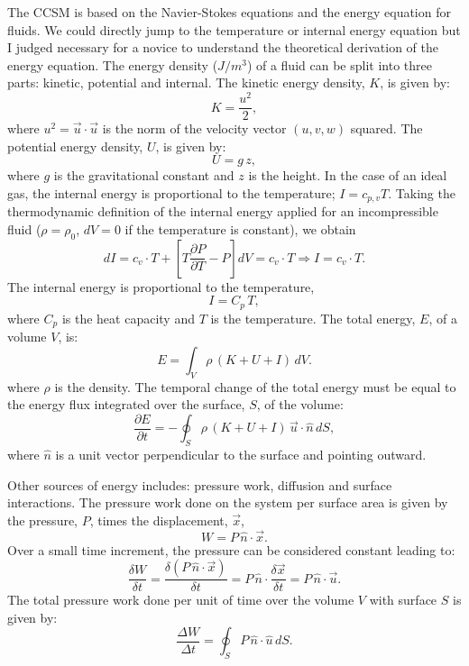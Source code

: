 The CCSM is based on the Navier-Stokes equations and the energy equation for fluids. We could directly jump to the temperature or internal energy equation but I judged necessary for a novice to understand the theoretical derivation of the energy equation. The energy density ($J/m^3$) of a fluid can be split into three parts: kinetic, potential and internal. The kinetic energy density, $K$, is given by:
\begin{equation}
K = \frac{u^2}{2},
\end{equation}
where $u^2 = \vec{u} \cdot \vec{u}$ is the norm of the velocity vector $(u,v,w)$ squared. The potential energy density, $U$, is given by:
\begin{equation}
U = g \, z,
\end{equation}
where $g$ is the gravitational constant and $z$ is the height. In the case of an ideal gas, the internal energy is proportional to the temperature; $I = c_{p,v} T$. Taking the thermodynamic definition of the internal energy applied for an incompressible fluid ($\rho = \rho_0$, $dV=0$ if the temperature is constant), we obtain 
\begin{equation}
dI = c_v \cdot T + \left[ T \frac{\partial P}{\partial T} -P \right]dV = c_v \cdot T \Rightarrow I = c_v \cdot T.
\end{equation}
The internal energy is proportional to the temperature,
\begin{equation}\label{int}
I = C_p \, T,
\end{equation}
where $C_p$ is the heat capacity and $T$ is the temperature. The total energy, $E$, of a volume $V$, is:
\begin{equation}
E = \int_V \rho \, (K+U+I)\, dV.
\end{equation}
where $\rho$ is the density. The temporal change of the total energy must be equal to the energy flux integrated over the surface, $S$, of the volume:
\begin{equation}\label{heq}
\frac{\partial E}{\partial t} = -\oint_S \rho \,   (K+U+I) \, \vec{u} \cdot \hat{n} \, dS,
\end{equation}
where $\hat{n}$ is a unit vector perpendicular to the surface and pointing outward.

Other sources of energy includes: pressure work, diffusion and surface interactions. The pressure work done on the system per surface area is given by the pressure, $P$, times the displacement, $\vec{x}$,
\begin{equation}
W = P\,\hat{n}\cdot \vec{x}.
\end{equation}
Over a small time increment, the pressure can be considered constant leading to:
\begin{equation}
\frac{\delta W}{\delta t} = \frac{ \delta(P\,\hat{n}\cdot \vec{x})}{\delta t} = P\,\hat{n} \cdot \frac{\delta \vec{x}}{\delta t} = P\,\hat{n} \cdot \vec{u}.
\end{equation}
The total pressure work done per unit of time over the volume $V$ with surface $S$ is given by:
\begin{equation}\label{work}
\frac{\Delta W}{\Delta t} = \oint_S P \,  \hat{n} \cdot \hat{u} \, dS.
\end{equation}


